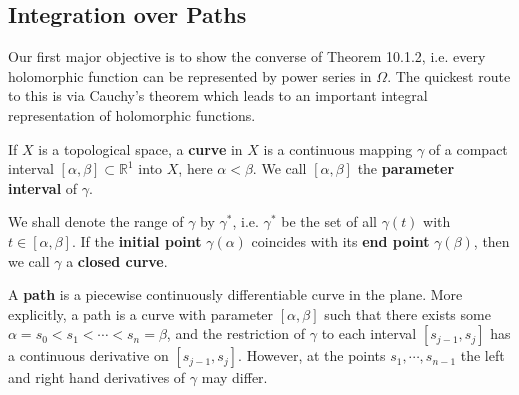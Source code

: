 \subsection{Integration over Paths}
Our first major objective is to show the converse of Theorem 10.1.2, i.e. every holomorphic function can be represented by power series in $\Omega$. The quickest route to this is via Cauchy's theorem which leads to an important integral representation of holomorphic functions.
\begin{definition}
If $X$ is a topological space, a \textbf{curve} in $X$ is a continuous mapping $\gamma$ of a compact interval $[\alpha,\beta]\subset\mathbb{R}^1$ into $X$, here $\alpha<\beta$. We call $[\alpha,\beta]$ the \textbf{parameter interval} of $\gamma$.
\end{definition}
We shall denote the range of $\gamma$ by $\gamma^*$, i.e. $\gamma^*$ be the set of all $\gamma(t)$ with $t\in[\alpha,\beta]$. If the \textbf{initial point} $\gamma(\alpha)$ coincides with its \textbf{end point} $\gamma(\beta)$, then we call $\gamma$ a \textbf{closed curve}.\par
A \textbf{path} is a piecewise continuously differentiable curve in the plane. More explicitly, a path is a curve with parameter $[\alpha,\beta]$ such that there exists some $\alpha=s_0<s_1<\cdots<s_n=\beta$, and the restriction of $\gamma$ to each interval $[s_{j-1},s_j]$ has a continuous derivative on $[s_{j-1},s_j]$. However, at the points $s_1,\cdots,s_{n-1}$ the left and right hand derivatives of $\gamma$ may differ.
\begin{center}



\end{center}
